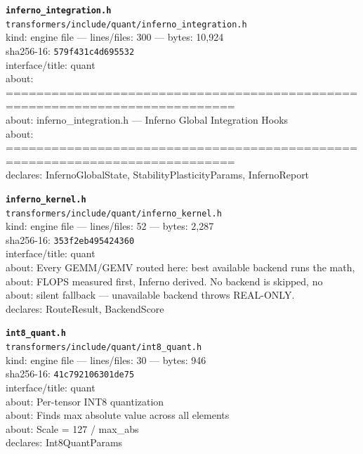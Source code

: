 \noindent\textbf{\texttt{inferno\_integration.h}}\\
\texttt{transformers/include/quant/inferno\_integration.h}\\
kind: engine file --- lines/files: 300 --- bytes: 10,924\\
sha256-16: \texttt{579f431c4d695532}\\
interface/title: quant\\
about: ============================================================================\\
about: inferno\_integration.h — Inferno Global Integration Hooks\\
about: ============================================================================\\
declares: InfernoGlobalState, StabilityPlasticityParams, InfernoReport\\
\vspace*{6.0pt}
\newpage

\noindent\textbf{\texttt{inferno\_kernel.h}}\\
\texttt{transformers/include/quant/inferno\_kernel.h}\\
kind: engine file --- lines/files: 52 --- bytes: 2,287\\
sha256-16: \texttt{353f2eb495424360}\\
interface/title: quant\\
about: Every GEMM/GEMV routed here: best available backend runs the math,\\
about: FLOPS measured first, Inferno derived. No backend is skipped, no\\
about: silent fallback — unavailable backend throws REAL-ONLY.\\
declares: RouteResult, BackendScore\\
\vspace*{6.0pt}

\noindent\textbf{\texttt{int8\_quant.h}}\\
\texttt{transformers/include/quant/int8\_quant.h}\\
kind: engine file --- lines/files: 30 --- bytes: 946\\
sha256-16: \texttt{41c792106301de75}\\
interface/title: quant\\
about: Per-tensor INT8 quantization\\
about: Finds max absolute value across all elements\\
about: Scale = 127 / max\_abs\\
declares: Int8QuantParams\\
\vspace*{6.0pt}

